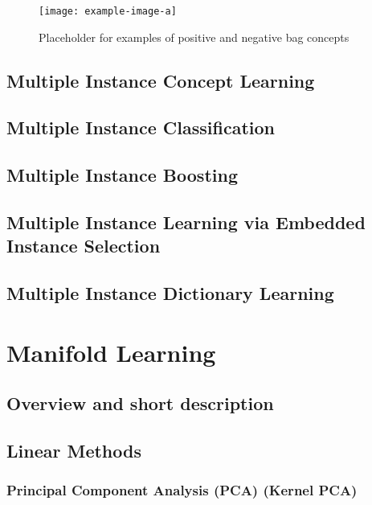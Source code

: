 \begin{center}
	\begin{figure*}[h]
		\centering
		\texttt{[image: example-image-a]}
		\caption{Placeholder for examples of positive and negative bag concepts}
		\label{fig:bag_eg}
	\end{figure*}
\end{center}

\subsection{Multiple Instance Concept Learning}

\subsection{Multiple Instance Classification}

\subsection{Multiple Instance Boosting}

\subsection{Multiple Instance Learning via Embedded Instance Selection}

\subsection{Multiple Instance Dictionary Learning}


\section{Manifold Learning}

\subsection{Overview and short description}


\subsection{Linear Methods}

\subsubsection{Principal Component Analysis (PCA) (Kernel PCA)}

